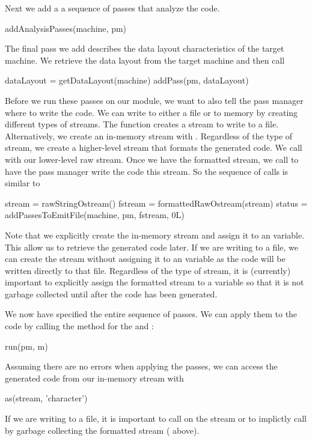 \documentclass[article]{jss}
\begin{document}
Next we add a a sequence of passes that analyze the code.
\begin{RCode}
addAnalysisPasses(machine, pm)
\end{RCode}

The final pass we add describes the
data layout characteristics of the target machine.
We retrieve the data layout from the target machine and
then call 
\begin{RCode}
dataLayout = getDataLayout(machine)
addPass(pm, dataLayout)
\end{RCode}


Before we run these passes on our module, we want to also tell the
pass manager where to write the code.  We can write to either a file
or to memory by creating different types of streams.  The function
 creates a stream to write to a file.
Alternatively, we create an in-memory stream with
. 
Regardless of the type of stream, we create a higher-level
stream that formats the generated code. 
We call  with our lower-level raw stream.
Once we have the formatted stream, we call
 to have the pass manager write the code
this stream.
So the sequence of calls is similar to 
\begin{RCode}
stream = rawStringOstream()
fstream = formattedRawOstream(stream)
status = addPassesToEmitFile(machine, pm, fstream, 0L)
\end{RCode}
Note that we explicitly create the in-memory stream and assign it to
an \R{} variable. This allow us to retrieve the generated code later.
If we are writing to a file, we can create the stream without
assigning it to an \R{} variable as the code will be written directly
to that file.
Regardless of the type of stream, it is (currently) important to explicitly
assign the formatted stream to a variable so that it is not garbage
collected until after the code has been generated.

We now have specified the entire sequence of passes.  We can apply
them to the code by calling the  method for the
 and :
\begin{RCode}
run(pm, m)
\end{RCode}

Assuming there are no errors when applying the passes, 
we can access the generated code from our in-memory stream
with 
\begin{RCode}
as(stream, 'character')
\end{RCode}
If we are writing to a file, it is important to call
 on the stream or to implictly call 
by garbage collecting the formatted stream ( above).
\end{document}
